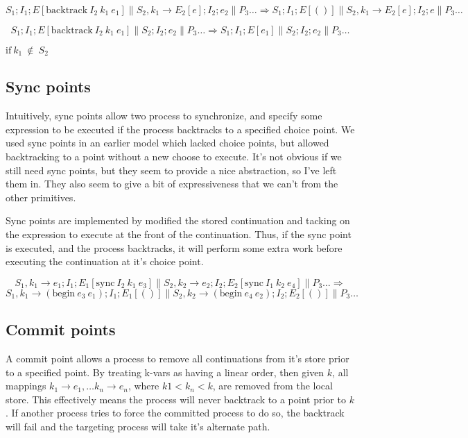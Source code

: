 \documentclass[11pt]{article}
\begin{document}
$$
S_1;I_1;E[\text{backtrack}~I_2~k_1~e_1] \parallel S_2,k_1 \to
E_2[e];I_2;e_2
\parallel P_3 \dots
\Rightarrow S_1;I_1;E[()] \parallel S_2,k_1 \to E_2[e];I_2;e \parallel
P_3 \dots$$

$$S_1;I_1;E[\text{backtrack}~I_2~k_1~e_1] \parallel S_2;I_2;e_2
\parallel P_3 \dots
\Rightarrow S_1;I_1;E[e_1] \parallel S_2;I_2;e_2 \parallel P_3 \dots$$

$\text{if}~k_1~\not\in~S_2$

\subsection{Sync points}
Intuitively, sync points allow two process to synchronize, and specify
some expression to be executed if the process backtracks to a specified
choice point. We used sync points in an earlier model which lacked
choice points, but allowed backtracking to a point without a new choose
to execute. It's not obvious if we still need sync points, but they seem
to provide a nice abstraction, so I've left them in. They also seem to
give a bit of expressiveness that we can't from the other primitives.

Sync points are implemented by modified the stored continuation and
tacking on the expression to execute at the front of the continuation.
Thus, if the sync point is executed, and the process backtracks, it will
perform some extra work before executing the continuation at it's choice
point.

$$
S_1,k_1 \to e_1;I_1;E_1[\text{sync}~I_2~k_1~e_3] \parallel 
S_2,k_2 \to e_2;I_2;E_2[\text{sync}~I_1~k_2~e_4] \parallel P_3 \dots
\Rightarrow $$$
S_1,k_1 \to (\text{begin}~e_3~e_1);I_1;E_1[()] \parallel 
S_2,k_2 \to (\text{begin}~e_4~e_2);I_2;E_2[()] \parallel P_3 \dots
$

\subsection{Commit points}
\label{subsec:commit}
A commit point allows a process to remove all continuations from it's
store prior to a specified point. By treating k-vars as having a linear
order, then given $k$, all mappings $k_1 \to e_1, \dots k_n \to e_n$, where
$k1 < k_n < k$, are removed from the local store. This effectively means
the process will never backtrack to a point prior to $k$. If another
process tries to force the committed process to do so, the backtrack
will fail and the targeting process will take it's alternate path.
\end{document}
